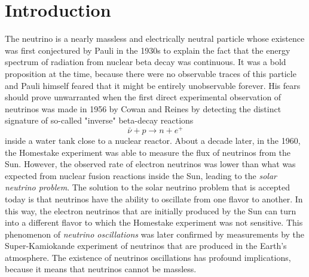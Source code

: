 \setchapterpreamble[u]{\margintoc}
\chapter{Introduction}

The neutrino is a nearly massless and electrically neutral particle whose existence was first conjectured by Pauli in the 1930s to explain the fact that the energy spectrum of radiation from nuclear beta decay was continuous. It was a bold proposition at the time, because there were no observable traces of this particle and Pauli himself feared that it might be entirely unobservable forever. His fears should prove unwarranted when the first direct experimental observation of neutrinos was made in 1956 by Cowan and Reines\cite{cowan:1956} by detecting the distinct signature of so-called "inverse" beta-decay reactions
\begin{equation}
    \bar{\nu} + p \rightarrow n + e^+
\end{equation}
inside a water tank close to a nuclear reactor. About a decade later, in the 1960, the Homestake experiment was able to measure the flux of neutrinos from the Sun. However, the observed rate of electron neutrinos was lower than what was expected from nuclear fusion reactions inside the Sun, leading to the \emph{solar neutrino problem}. The solution to the solar neutrino problem that is accepted today is that neutrinos have the ability to oscillate from one flavor to another. In this way, the electron neutrinos that are initially produced by the Sun can turn into a different flavor to which the Homestake experiment was not sensitive. This phenomenon of \emph{neutrino oscillations} was later confirmed by measurements by the Super-Kamiokande experiment of neutrinos that are produced in the Earth's atmosphere\cite{PhysRevLett.81.1562}. The existence of neutrinos oscillations has profound implications, because it means that neutrinos cannot be massless.

